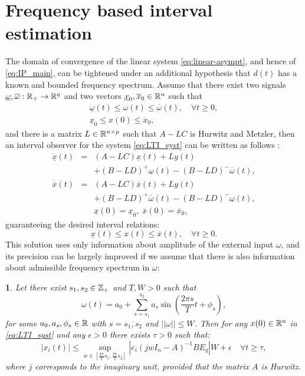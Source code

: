 \documentclass[letterpaper, 10 pt, conference]{ieeeconf}
\theoremstyle{plain}
\newtheorem{lem}{\protect\lemmaname}
\theoremstyle{definition}
\theoremstyle{plain}
\theoremstyle{plain}
\theoremstyle{remark}
\providecommand{\lemmaname}{Lemma}
\begin{document}
\section{\label{sec:Frequency} Frequency based interval estimation}
The domain of convergence of the linear system \eqref{eq:linear-asympt}, and hence of \eqref{eq:IP_main}, can be tightened under an additional hypothesis that $d(t)$ has a known and bounded frequency spectrum.
Assume that there exist two signals $\underline{\omega},\overline{\omega}:\mathbb{R}_{+}\to\mathbb{R}^{q}$ and two vectors $\underline{x}_{0},\overline{x}_{0}\in\mathbb{R}^{n}$ such that
\begin{gather*}
\underline{\omega}(t)\leq\omega(t)\leq\overline{\omega}(t),\quad\forall t\geq0,\\
\underline{x}_{0}\leq x(0)\leq\overline{x}_{0},
\end{gather*} and there is a matrix $L\in\mathbb{R}^{n\times p}$ such that $A-LC$ is Hurwitz and Metzler, then an interval observer for the system \eqref{eq:LTI_syst} can be written as follows \cite{REZ11}:
\begin{eqnarray}
\dot{\underline{x}}(t) & = & (A-LC)\underline{x}(t)+Ly(t)\nonumber \\
 &  & +(B-LD)^{+}\underline{\omega}(t)-(B-LD)^{-}\overline{\omega}(t),\nonumber \\
\dot{\overline{x}}(t) & = & (A-LC)\overline{x}(t)+Ly(t)\label{eq:IO_LTI}\\
 &  & +(B-LD)^{+}\overline{\omega}(t)-(B-LD)^{-}\underline{\omega}(t),\nonumber \\
 &  & \underline{x}(0)=\underline{x}_{0},\;\overline{x}(0)=\overline{x}_{0},\nonumber 
\end{eqnarray}
guaranteeing the desired interval relations:
\[
\underline{x}(t)\leq x(t)\leq\overline{x}(t),\quad\forall t\geq0.
\]
This solution uses only information about amplitude of the external input $\omega$, and its precision can be largely improved if we assume that there is also information about admissible frequency spectrum in $\omega$:
\begin{lem}
\label{lem:IntFreq} Let there exist $s_{1},s_{2}\in\mathbb{Z}_{+}$ and $T,W>0$
such that
\[
\omega(t)=a_{0}+\sum_{s=s_{1}}^{s_{2}}a_{s}\sin\left(\frac{2\pi s}{T}t+\phi_{s}\right),
\]
for some $a_{0},a_{s},\phi_{s}\in\mathbb{R}$ with $s=\overline{s_{1},s_{2}}$ and $||\omega||\leq W$. Then for any $x(0)\in\mathbb{R}^{n}$ in \eqref{eq:LTI_syst} and any $\epsilon>0$ there exists $\tau>0$ such that:
\[
|x_{i}(t)|\leq\sup_{w\in[\frac{2\pi}{T}s_{1},\frac{2\pi}{T}s_{2}]}|e_{i}(jwI_{n}-A)^{-1}BE_{q}|W+\epsilon\quad\forall t\geq\tau,
\]
where $j$ corresponds to the imaginary unit, provided that the matrix $A$ is Hurwitz.
\end{lem}
\end{document}
